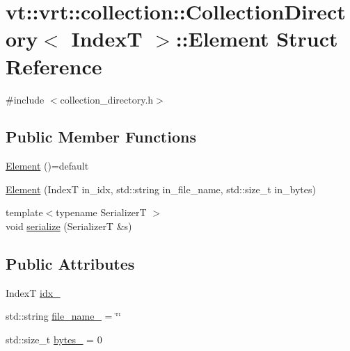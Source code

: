 \hypertarget{structvt_1_1vrt_1_1collection_1_1_collection_directory_1_1_element}{}\section{vt\+:\+:vrt\+:\+:collection\+:\+:Collection\+Directory$<$ IndexT $>$\+:\+:Element Struct Reference}
\label{structvt_1_1vrt_1_1collection_1_1_collection_directory_1_1_element}


{\ttfamily \#include $<$collection\+\_\+directory.\+h$>$}

\subsection*{Public Member Functions}
\begin{DoxyCompactItemize}
\item 
\hyperlink{structvt_1_1vrt_1_1collection_1_1_collection_directory_1_1_element_ab67c2afc048977d3d5797ecd5e66c87f}{Element} ()=default
\item 
\hyperlink{structvt_1_1vrt_1_1collection_1_1_collection_directory_1_1_element_a7f1693cd2493be6bb4cf6e969b23b9eb}{Element} (IndexT in\+\_\+idx, std\+::string in\+\_\+file\+\_\+name, std\+::size\+\_\+t in\+\_\+bytes)
\item 
{\footnotesize template$<$typename SerializerT $>$ }\\void \hyperlink{structvt_1_1vrt_1_1collection_1_1_collection_directory_1_1_element_a9589d19d319cb0db665638790652d26b}{serialize} (SerializerT \&s)
\end{DoxyCompactItemize}
\subsection*{Public Attributes}
\begin{DoxyCompactItemize}
\item 
IndexT \hyperlink{structvt_1_1vrt_1_1collection_1_1_collection_directory_1_1_element_ab2c736aa3cdb294cdd0892a9d471f9ad}{idx\+\_\+}
\item 
std\+::string \hyperlink{structvt_1_1vrt_1_1collection_1_1_collection_directory_1_1_element_a831648ee90fa0d8dbda3d987ce2a441c}{file\+\_\+name\+\_\+} = \char`\"{}\char`\"{}
\item 
std\+::size\+\_\+t \hyperlink{structvt_1_1vrt_1_1collection_1_1_collection_directory_1_1_element_ab88e568797e11c5ccc8c5313d85df527}{bytes\+\_\+} = 0
\end{DoxyCompactItemize}


